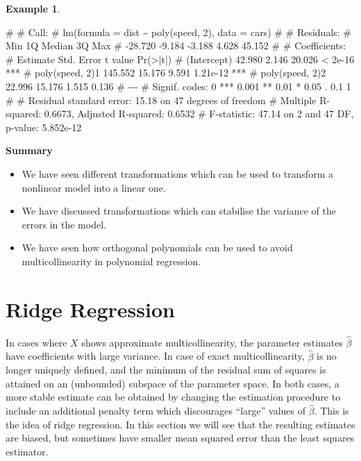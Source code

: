 \documentclass[
  a4paper,
]{article}
\newenvironment{Shaded}{\begin{snugshade}}{\end{snugshade}}
\newcommand{\NormalTok}[1]{#1}
\providecommand{\tightlist}{%
  \setlength{\itemsep}{0pt}\setlength{\parskip}{0pt}}
\theoremstyle{definition}
\theoremstyle{definition}
\newtheorem{example}{Example}[section]
\theoremstyle{definition}
\theoremstyle{definition}
\theoremstyle{remark}
\begin{document}
\begin{example}
\begin{Shaded}
\begin{Highlighting}[]
\NormalTok{\# }
\NormalTok{\# Call:}
\NormalTok{\# lm(formula = dist \textasciitilde{} poly(speed, 2), data = cars)}
\NormalTok{\# }
\NormalTok{\# Residuals:}
\NormalTok{\#     Min      1Q  Median      3Q     Max }
\NormalTok{\# {-}28.720  {-}9.184  {-}3.188   4.628  45.152 }
\NormalTok{\# }
\NormalTok{\# Coefficients:}
\NormalTok{\#                 Estimate Std. Error t value Pr(\textgreater{}|t|)    }
\NormalTok{\# (Intercept)       42.980      2.146  20.026  \textless{} 2e{-}16 ***}
\NormalTok{\# poly(speed, 2)1  145.552     15.176   9.591 1.21e{-}12 ***}
\NormalTok{\# poly(speed, 2)2   22.996     15.176   1.515    0.136    }
\NormalTok{\# {-}{-}{-}}
\NormalTok{\# Signif. codes:  0 \textquotesingle{}***\textquotesingle{} 0.001 \textquotesingle{}**\textquotesingle{} 0.01 \textquotesingle{}*\textquotesingle{} 0.05 \textquotesingle{}.\textquotesingle{} 0.1 \textquotesingle{} \textquotesingle{} 1}
\NormalTok{\# }
\NormalTok{\# Residual standard error: 15.18 on 47 degrees of freedom}
\NormalTok{\# Multiple R{-}squared:  0.6673,  Adjusted R{-}squared:  0.6532 }
\NormalTok{\# F{-}statistic: 47.14 on 2 and 47 DF,  p{-}value: 5.852e{-}12}
\end{Highlighting}
\end{Shaded}

\end{example}

\textbf{Summary}

\begin{itemize}
\tightlist
\item
  We have seen different transformations which can be used
  to transform a nonlinear model into a linear one.
\item
  We have discussed transformations which can stabilise the
  variance of the errors in the model.
\item
  We have seen how orthogonal polynomials can be used to avoid
  multicollinearity in polynomial regression.
\end{itemize}

\clearpage

\hypertarget{S12-ridge}{%
\section{Ridge Regression}\label{S12-ridge}}

In cases where \(X\) shows approximate multicollinearity, the parameter estimates
\(\hat\beta\) have coefficients with large variance. In case of exact
multicollinearity, \(\hat\beta\) is no longer uniquely defined, and the minimum
of the residual sum of squares is attained on an (unbounded) subspace of the
parameter space. In both cases, a more stable estimate can be obtained by
changing the estimation procedure to include an additional penalty term which
discourages ``large'' values of \(\hat\beta\). This is the idea of ridge
regression. In this section we will see that the resulting estimates are
biased, but sometimes have smaller mean squared error than the least squares
estimator.
\end{document}
